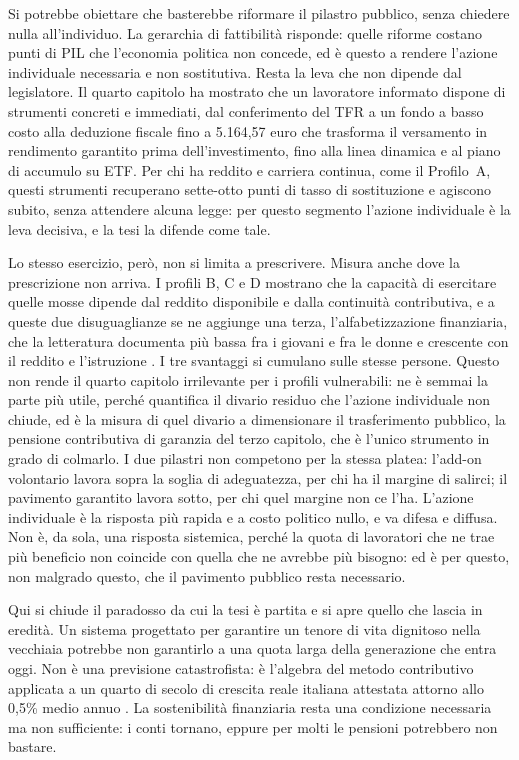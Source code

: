 Si potrebbe obiettare che basterebbe riformare il pilastro pubblico, senza chiedere
nulla all'individuo. La gerarchia di fattibilità risponde: quelle riforme costano
punti di PIL che l'economia politica non concede, ed è questo a rendere l'azione
individuale necessaria e non sostitutiva. Resta la leva che non dipende dal
legislatore. Il quarto capitolo ha mostrato che un lavoratore informato dispone di
strumenti concreti e immediati, dal conferimento del TFR a un fondo a basso costo
alla deduzione fiscale fino a 5.164,57 euro che trasforma il versamento in
rendimento garantito prima dell'investimento, fino alla linea dinamica e al piano di
accumulo su ETF. Per chi ha reddito e carriera continua, come il Profilo~A, questi
strumenti recuperano sette-otto punti di tasso di sostituzione e agiscono subito,
senza attendere alcuna legge: per questo segmento l'azione individuale è la leva
decisiva, e la tesi la difende come tale.

Lo stesso esercizio, però, non si limita a prescrivere. Misura anche dove la
prescrizione non arriva. I profili B, C e D mostrano che la capacità di esercitare
quelle mosse dipende dal reddito disponibile e dalla continuità contributiva, e a
queste due disuguaglianze se ne aggiunge una terza, l'alfabetizzazione finanziaria,
che la letteratura documenta più bassa fra i giovani e fra le donne e crescente
con il reddito e l'istruzione \cite{LusardiMitchell2014}. I
tre svantaggi si cumulano sulle stesse persone. Questo non rende il quarto capitolo
irrilevante per i profili vulnerabili: ne è semmai la parte più utile, perché
quantifica il divario residuo che l'azione individuale non chiude, ed è la misura
di quel divario a dimensionare il trasferimento pubblico, la pensione contributiva
di garanzia del terzo capitolo, che è l'unico strumento in grado di colmarlo. I
due pilastri non competono per la stessa platea: l'add-on volontario lavora sopra
la soglia di adeguatezza, per chi ha il margine di salirci; il pavimento garantito
lavora sotto, per chi quel margine non ce l'ha. L'azione individuale è la risposta
più rapida e a costo politico nullo, e va difesa e diffusa. Non è, da sola, una
risposta sistemica, perché la quota di lavoratori che ne trae più beneficio non
coincide con quella che ne avrebbe più bisogno: ed è per questo, non malgrado
questo, che il pavimento pubblico resta necessario.

Qui si chiude il paradosso da cui la tesi è partita e si apre quello che lascia
in eredità. Un sistema progettato per garantire un tenore di vita dignitoso nella
vecchiaia potrebbe non garantirlo a una quota larga della generazione che entra
oggi. Non è una previsione catastrofista: è l'algebra del metodo contributivo
applicata a un quarto di secolo di crescita reale italiana attestata attorno allo
0,5\% medio annuo \cite{MEF_RGS2025}. La sostenibilità finanziaria resta una
condizione necessaria ma non sufficiente: i conti tornano, eppure per molti le
pensioni potrebbero non bastare.

